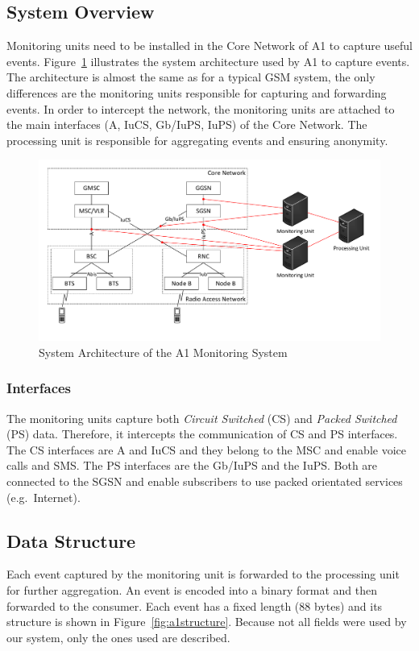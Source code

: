 \documentclass[master,english]{hgbthesis}
\begin{document}
\subsection{System Overview}
Monitoring units need to be installed in the Core Network of A1 to capture useful events. Figure~\ref{fig:A1Network} illustrates the system architecture used by A1 to capture events. The architecture is almost the same as for a typical GSM system, the only differences are the monitoring units responsible for capturing and forwarding events.
In order to intercept the network, the monitoring units are attached to the main interfaces (A, IuCS, Gb/IuPS, IuPS) of the Core Network. The processing unit is responsible for aggregating events and ensuring anonymity.
\begin{figure}
	\centering
	\includegraphics[width=\linewidth]{./images/A1Network}
	\caption{System Architecture of the A1 Monitoring System}
	\label{fig:A1Network}
\end{figure}
\subsubsection{Interfaces}
The monitoring units capture both \emph{Circuit Switched} (CS) and \emph{Packed Switched} (PS) data. Therefore, it intercepts the communication of CS and PS interfaces. The CS interfaces are A and IuCS and they belong to the MSC and enable voice calls and SMS. The PS interfaces are the Gb/IuPS and the IuPS. Both are connected to the SGSN and enable subscribers to use packed orientated services (e.g.\ Internet).
\subsection{Data Structure}
\label{sec:dataa1}
Each event captured by the monitoring unit is forwarded to the processing unit for further aggregation. An event is encoded into a binary format and then forwarded to the consumer. Each event has a fixed length (88 bytes) and its structure is shown in Figure~\ref{fig:a1structure}.
Because not all fields were used by our system, only the ones used are described.
\end{document}
